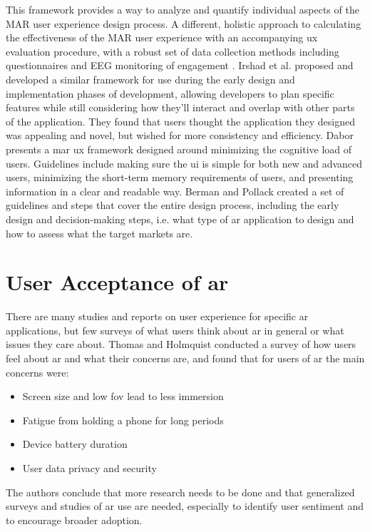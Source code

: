 \documentclass[thesis]{fputhesis}
\begin{document}
\begin{body}
This framework provides a way to analyze and quantify individual aspects of the MAR user experience design process. A different, holistic approach to calculating the effectiveness of the MAR user experience with an accompanying \acrfull{ux} evaluation procedure, with a robust set of data collection methods including questionnaires and EEG monitoring of engagement \cite{satti_holistic_2019}. Irshad et al. \cite{irshad_design_2020} proposed and developed a similar framework for use during the early design and implementation phases of development, allowing developers to plan specific features while still considering how they'll interact and overlap with other parts of the application. They found that users thought the application they designed was appealing and novel, but wished for more consistency and efficiency. Dabor \cite{dabor_design_2019} presents a \acrshort{mar} \acrshort{ux} framework designed around minimizing the cognitive load of users. Guidelines include making sure the \acrshort{ui} is simple for both new and advanced users, minimizing the short-term memory requirements of users, and presenting information in a clear and readable way. Berman and Pollack \cite{berman_strategies_2021} created a set of guidelines and steps that cover the entire design process, including the early design and decision-making steps, i.e. what type of \acrshort{ar} application to design and how to assess what the target markets are. 

\section{User Acceptance of \acrshort{ar}}
There are many studies and reports on user experience for specific \acrshort{ar} applications, but few surveys of what users think about \acrshort{ar} in general or what issues they care about. Thomas and Holmquist \cite{thomas_is_2021} conducted a survey of how users feel about \acrshort{ar} and what their concerns are, and found that for users of \acrshort{ar} the main concerns were: 
\begin{itemize}
    \item Screen size and low \acrshort{fov} lead to less immersion
    \item Fatigue from holding a phone for long periods
    \item Device battery duration
    \item User data privacy and security
\end{itemize}
The authors conclude that more research needs to be done and that generalized surveys and studies of \acrshort{ar} use are needed, especially to identify user sentiment and to encourage broader adoption. 


\end{body}
\end{document}
